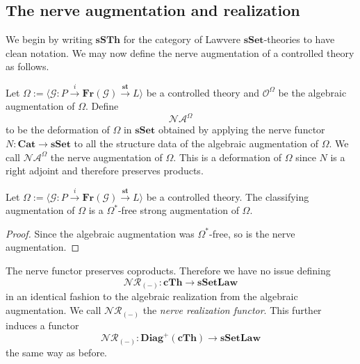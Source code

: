 \documentclass{tac}
\begin{document}
\subsection*{The nerve augmentation and realization}
We begin by writing $\mathbf{sSTh}$ for the category of Lawvere $\mathbf{sSet}$-theories to have clean notation. We may now define the nerve augmentation of a controlled theory as follows.
\begin{construction}
Let $\Omega:=\langle \mathcal{G}:P\xrightarrow{i}\mathbf{Fr}(\mathcal{G})\xrightarrow{\mathbf{st}}L\rangle$ be a controlled theory and $\mathcal{O}^\Omega$ be the algebraic augmentation of $\Omega$. Define
\[
\mathcal{NA}^\Omega
\]
to be the deformation of $\Omega$ in $\mathbf{sSet}$ obtained by applying the nerve functor $N:\mathbf{Cat}\to\mathbf{sSet}$ to all the structure data of the algebraic augmentation of $\Omega$. We call $\mathcal{NA}^\Omega$ the nerve augmentation of $\Omega$. This is a deformation of $\Omega$ since $N$ is a right adjoint and therefore preserves products.
\end{construction}

 \begin{theorem}
Let $\Omega:=\langle \mathcal{G}:P\xrightarrow{i}\mathbf{Fr}(\mathcal{G})\xrightarrow{\mathbf{st}}L\rangle$ be a controlled theory. The classifying augmentation of $\Omega$ is a $\Omega^*$-free strong augmentation of $\Omega$.
 \end{theorem}
 
 \begin{proof}
Since the algebraic augmentation was $\Omega^*$-free, so is the nerve augmentation.
 \end{proof}

The nerve functor preserves coproducts. Therefore we have no issue defining 
 \[
 \mathcal{NR}_{(-)}:\mathbf{cTh}\to\mathbf{sSet}\mathbf{Law}
 \]
 in an identical fashion to the algebraic realization from the algebraic augmentation. We call $\mathcal{NR}_{(-)}$ the \emph{nerve realization functor}. This further induces a functor 
 \[
 \mathcal{NR}_{(-)}:\mathbf{Diag}^+(\mathbf{cTh})\to\mathbf{sSet}\mathbf{Law}
 \]
the same way as before.
\end{document}
